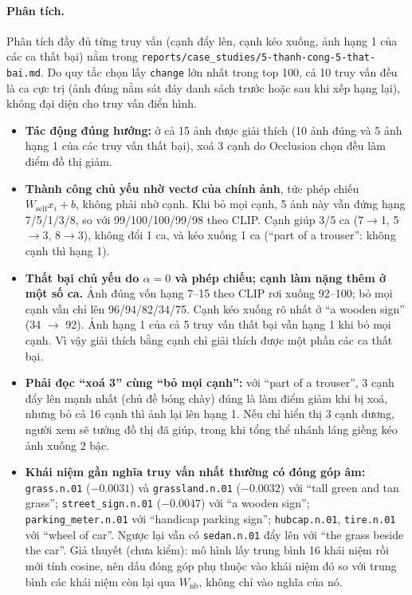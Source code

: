 \documentclass[12pt, a4paper]{article}
\newcommand{\code}[1]{\texttt{#1}}
\begin{document}
\paragraph{Phân tích.} Phân tích đầy đủ từng truy vấn (cạnh đẩy lên, cạnh kéo xuống, ảnh hạng 1 của các ca thất bại) nằm trong \code{reports/case\_studies/5-thanh-cong-5-that-bai.md}. Do quy tắc chọn lấy \code{change} lớn nhất trong top 100, cả 10 truy vấn đều là ca cực trị (ảnh đúng nằm sát đáy danh sách trước hoặc sau khi xếp hạng lại), không đại diện cho truy vấn điển hình.
\begin{itemize}
\item \textbf{Tác động đúng hướng:} ở cả 15 ảnh được giải thích (10 ảnh đúng và 5 ảnh hạng 1 của các truy vấn thất bại), xoá 3 cạnh do Occlusion chọn đều làm điểm đồ thị giảm.
\item \textbf{Thành công chủ yếu nhờ vectơ của chính ảnh}, tức phép chiếu $W_{\text{self}}x_i+b$, không phải nhờ cạnh. Khi bỏ mọi cạnh, 5 ảnh này vẫn đứng hạng 7/5/1/3/8, so với 99/100/100/99/98 theo CLIP. Cạnh giúp 3/5 ca (7$\to$1, 5$\to$3, 8$\to$3), không đổi 1 ca, và kéo xuống 1 ca (``part of a trouser'': không cạnh thì hạng 1).
\item \textbf{Thất bại chủ yếu do $\alpha=0$ và phép chiếu; cạnh làm nặng thêm ở một số ca.} Ảnh đúng vốn hạng 7--15 theo CLIP rơi xuống 92--100; bỏ mọi cạnh vẫn chỉ lên 96/94/82/34/75. Cạnh kéo xuống rõ nhất ở ``a wooden sign'' (34 $\to$ 92). Ảnh hạng 1 của cả 5 truy vấn thất bại vẫn hạng 1 khi bỏ mọi cạnh. Vì vậy giải thích bằng cạnh chỉ giải thích được một phần các ca thất bại.
\item \textbf{Phải đọc ``xoá 3'' cùng ``bỏ mọi cạnh'':} với ``part of a trouser'', 3 cạnh đẩy lên mạnh nhất (chủ đề bóng chày) đúng là làm điểm giảm khi bị xoá, nhưng bỏ cả 16 cạnh thì ảnh lại lên hạng 1. Nếu chỉ hiển thị 3 cạnh dương, người xem sẽ tưởng đồ thị đã giúp, trong khi tổng thể nhánh láng giềng kéo ảnh xuống 2 bậc.
\item \textbf{Khái niệm gần nghĩa truy vấn nhất thường có đóng góp âm:} \code{grass.n.01} ($-0.0031$) và \code{grassland.n.01} ($-0.0032$) với ``tall green and tan grass''; \code{street\_sign.n.01} ($-0.0047$) với ``a wooden sign''; \code{parking\_meter.n.01} với ``handicap parking sign''; \code{hubcap.n.01}, \code{tire.n.01} với ``wheel of car''. Ngược lại vẫn có \code{sedan.n.01} đẩy lên với ``the grass beside the car''. Giả thuyết (chưa kiểm): mô hình lấy trung bình 16 khái niệm rồi mới tính cosine, nên dấu đóng góp phụ thuộc vào khái niệm đó so với trung bình các khái niệm còn lại qua $W_{\text{nb}}$, không chỉ vào nghĩa của nó.

\end{itemize}
\end{document}
